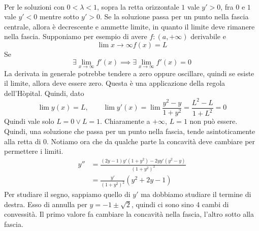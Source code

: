 \documentclass[a4paper]{article}
\begin{document}
\begin{snippetexercise}{}
\begin{align*}
    \end{align*}
    Per le soluzioni con \(0<\lambda<1\), sopra la retta orizzontale \(1\) vale \(y' > 0\),
    fra \(0\) e \(1\) vale \(y'<0\) mentre sotto \(y'>0\). Se la soluzione passa per un punto nella fascia centrale,
    allora è decrescente e ammette limite, in quanto il limite deve rimanere nella fascia.
    Supponiamo per esempio di avere \(f\colon (a, +\infty)\) derivabile e
    \[
        \lim{x\to\infty} f(x) = L
    \]
    Se \[
        \exists \lim_{x\to\infty} f'(x) \implies \exists \lim_{x\to\infty} f'(x) = 0
    \]
    La derivata in generale potrebbe tendere a zero oppure oscillare, quindi se esiste il limite,
    allora deve essere zero. Questa è una applicazione della regola dell'Hòpital.
    Quindi, dato
    \[
        \lim y(x) = L, \qquad \lim y'(x) = \lim \frac{y^2 - y}{1 + y^2} = \frac{L^2 - L}{1 + L^2} = 0
    \]
    Quindi vale solo \(L = 0 \lor L = 1\). Chiaramente a \(+\infty\), \(L=1\) non può essere.
    Quindi, una soluzione che passa per un punto nella fascia, tende asintoticamente alla retta di \(0\).
    Notiamo ora che da qualche parte la concavità deve cambiare per permettere i limiti.
    \begin{align*}
        y'' &= \frac{(2y - 1)y'(1 + y^2) - 2yy'(y^2-y)}{{(1 + y^2)}^2} \\
        &= \frac{y'}{{(1 + y^2)}^2} \left(y^2 + 2y - 1\right)
    \end{align*}
    Per studiare il segno, sappiamo quello di \(y'\) ma dobbiamo studiare il termine di destra. Esso di annulla per
    \(y = -1 \pm \sqrt{2}\), quindi ci sono sino 4 cambi di convessità. Il primo valore fa cambiare
    la concavità nella fascia, l'altro sotto alla fascia.
\end{snippetexercise}
\end{document}

